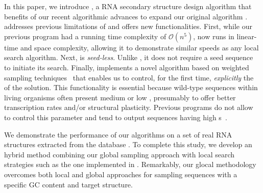 In this paper, we introduce \ourprog, a RNA secondary structure design algorithm that benefits of our recent algorithmic advances \citep{Reinharz:2013aa} to expand our original \RNAensign algorithm \citep{Levin:2012kx}. \ourprog addresses previous limitations of \RNAensign and offers new functionalities. First, while our previous program had a running time complexity of $\mathcal{O}(n^5)$, \ourprog now runs in linear-time and space complexity, allowing it to demonstrate similar speeds as any local search algorithm. Next, \ourprog is \textit{seed-less}. Unlike \RNAensign, it does not require a seed sequence to initiate its search. Finally, \ourprog implements a novel algorithm based on weighted sampling techniques~\citep{Bodini2010} that enables us to control, for the first time, \textit{explicitly} the \GCContent of the solution. This functionality is essential because wild-type sequences within living organisms often present medium or low \GCContent, presumably to offer better transcription rates and/or structural plasticity. Previous programs do not allow to control this parameter and tend to output sequences having high \GCContent{}s~\citep{Lyngso:2012vn}. 

We demonstrate the performance of our algorithms on a set of real RNA structures extracted from the \RNASTRAND database \citep{andronescu2008rna}. To complete this study, we develop an hybrid method combining our global sampling approach with local search strategies such as the one implemented in \RNAinverse.  Remarkably, our glocal methodology overcomes both local and global approaches  for sampling sequences with a specific GC content and target structure.